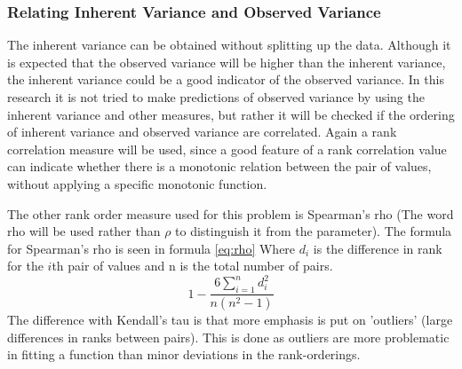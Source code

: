 \documentclass{scrartcl}
\newcommand\todo[1]{\textit{\textcolor{red}{#1}}}
\begin{document}
\subsubsection{Relating Inherent Variance and Observed Variance}
The inherent variance can be obtained without splitting up the data. Although it is expected that the observed variance will be higher than the inherent variance, the inherent variance could be a good indicator of the observed variance. In this research it is not tried to make predictions of observed variance by using the inherent variance and other measures, but rather it will be checked if the ordering of inherent variance and observed variance are correlated. Again a rank correlation measure will be used, since a good feature of a rank correlation value can indicate whether there is a monotonic relation between the pair of values, without applying a specific monotonic function. 
 
The other rank order measure used for this problem is Spearman's rho (The word rho will be used rather than $\rho$ to distinguish it from the parameter). The formula for Spearman's rho is seen in formula \ref{eq:rho} Where $d_{i}$ is the difference in rank for the $i$th pair of values and n is the total number of pairs.
\begin{equation}
\label{eq:rho}
1-\frac{6 \sum\limits_{i=1}^n d_{i}^{2}}{n(n^{2}-1)} 
\end{equation}
The difference with Kendall's tau is that more emphasis is put on 'outliers' (large differences in ranks between pairs). This is done as outliers are more problematic in fitting a function than minor deviations in the rank-orderings.

\end{document}
